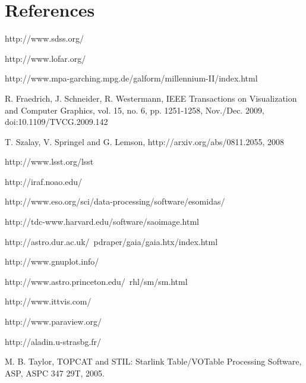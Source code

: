 \documentclass[1p,times]{elsarticle}
\begin{document}
\section*{References}


\begin{thebibliography}{00}








 http://www.sdss.org/

 http://www.lofar.org/

http://www.mpa-garching.mpg.de/galform/millennium-II/index.html

R. Fraedrich, J. Schneider, R. Westermann, 
IEEE Transactions on Visualization and Computer Graphics, vol. 15, no. 6, pp. 1251-1258, 
Nov./Dec. 2009, doi:10.1109/TVCG.2009.142

T. Szalay, V. Springel and G. Lemson, http://arxiv.org/abs/0811.2055, 2008

http://www.lsst.org/lsst

 http://iraf.noao.edu/

 http://www.eso.org/sci/data-processing/software/esomidas/

 http://tdc-www.harvard.edu/software/saoimage.html

 http://astro.dur.ac.uk/~pdraper/gaia/gaia.htx/index.html

 http://www.gnuplot.info/

 http://www.astro.princeton.edu/~rhl/sm/sm.html

 http://www.ittvis.com/


 http://www.paraview.org/

 http://aladin.u-strasbg.fr/

 M. B. Taylor, TOPCAT and STIL: Starlink Table/VOTable Processing Software, ASP, ASPC 347 29T, 2005.


\end{thebibliography}
\end{document}
